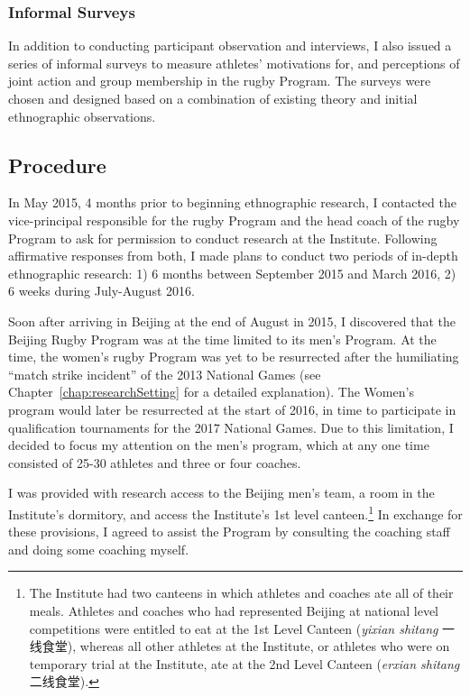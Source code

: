 \begin{CJK}{UTF8}{gbsn}
  \subsubsection{Informal Surveys}
  In addition to conducting participant observation and interviews, I also issued a series of informal surveys to measure athletes' motivations for, and perceptions of joint action and group membership in the rugby Program.  The surveys were chosen and designed based on a combination of existing theory and initial ethnographic observations.


\subsection{Procedure}

In May 2015, 4 months prior to beginning ethnographic research, I contacted the vice-principal responsible for the rugby Program and the head coach of the rugby Program to ask for permission to conduct research at the Institute.  Following affirmative responses from both, I made plans to conduct two periods of in-depth ethnographic research: 1) 6 months between September 2015 and March 2016, 2) 6 weeks during July-August 2016.

Soon after arriving in Beijing at the end of August in 2015, I discovered that the Beijing Rugby Program was at the time limited to its men's Program.  At the time, the women's rugby Program was yet to be resurrected after the humiliating ``match strike incident'' of the 2013 National Games (see Chapter~\ref{chap:researchSetting} for a detailed explanation).  The Women's program would later be resurrected at the start of 2016, in time to participate in qualification tournaments for the 2017 National Games.  Due to this limitation, I decided to focus my attention on the men's program, which at any one time consisted of 25-30 athletes and three or four coaches.

I was provided with research access to the Beijing men's team, a room in the Institute's dormitory, and access the Institute's 1st level canteen.\footnote{The Institute had two canteens in which athletes and coaches ate all of their meals.  Athletes and coaches who had represented Beijing at national level competitions were entitled to eat at the 1st Level Canteen (\textit{yixian shitang} 一线食堂), whereas all other athletes at the Institute, or athletes who were on temporary trial at the Institute, ate at the 2nd Level Canteen (\textit{erxian shitang} 二线食堂).}  In exchange for these provisions, I agreed to assist the Program by consulting the coaching staff and doing some coaching myself.


\end{CJK}
